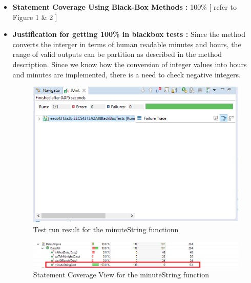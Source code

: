 \documentclass[fontsize=12pt,paper=letter,twoside]{scrartcl}
\begin{document}
\begin{itemize}
\item \textbf {Statement Coverage Using Black-Box Methods :}
100\% [ refer to Figure 1 \& 2 ] 
\item \textbf {Justification for getting 100\% in blackbox tests :} Since the method converts the interger in terms of human readable minutes and hours, the range of valid outputs can be partition as described in the method description. Since we know how the conversion of integer values into hours and minutes are implemented, there is a need to check negative integers.
\begin{figure}[!htb]
\begin{center}
\includegraphics[width=.99\textwidth]{images/wbt/ect/bbt_ect.png}
\end{center}
\caption{Test run result for the minuteString functionn}
\label{fig:bbt_ect_pass}
\end{figure}

\begin{figure}[!htb]
\begin{center}
\includegraphics[width=.90\textwidth]{images/wbt/ect/statement_coverage.png}
\end{center}
\caption{Statement Coverage View for the minuteString function}
\label{fig:wbt_ect_code}
\end{figure}


\end{itemize}
\end{document}
